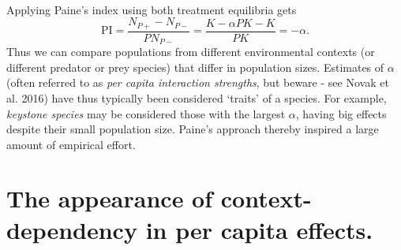 \documentclass[10pt,letterpaper]{article}
\begin{document}
\\[0.2in]
Applying Paine's index using both treatment equilibria gets
\begin{equation}
\text{PI}=\frac{N_{P+}-N_{P-}}{P N_{P-}}=  \frac{K-\alpha P K - K}{PK}=-\alpha.
\end{equation}
Thus we can compare populations from different environmental contexts (or different predator or prey species) that differ in population sizes.  Estimates of $\alpha$ (often referred to as \emph{per capita interaction strengths}, but beware - see Novak et al. 2016) have thus typically been considered `traits' of a species.  For example, \emph{keystone species} may be considered those with the largest $\alpha$, having big effects despite their small population size.  Paine's approach thereby inspired a large amount of empirical effort.

\section{The appearance of context-dependency in per capita effects.}
\label{ApparentContext}
\end{document}
